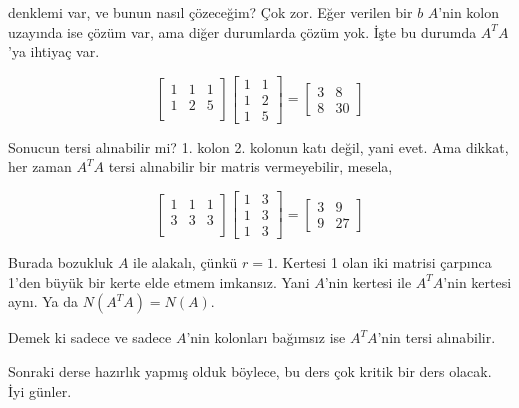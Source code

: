 \documentclass[12pt,fleqn]{article}\usepackage{../../common}
\begin{document}
denklemi var, ve bunun nasıl çözeceğim? Çok zor. Eğer verilen bir $b$ $A$'nin
kolon uzayında ise çözüm var, ama diğer durumlarda çözüm yok. İşte bu durumda
$A^TA$'ya ihtiyaç var.

$$ 
\left[\begin{array}{rrr}
1 & 1 & 1\\
1 & 2 & 5\\
\end{array}\right]
\left[\begin{array}{rr}
1 & 1 \\
1 & 2 \\
1 & 5
\end{array}\right] =
\left[\begin{array}{rr}
3 & 8 \\
8 & 30
\end{array}\right] 
 $$

Sonucun tersi alınabilir mi? 1. kolon 2. kolonun katı değil, yani evet. Ama
dikkat, her zaman $A^TA$ tersi alınabilir bir matris vermeyebilir, mesela,

$$ 
\left[\begin{array}{rrr}
1 & 1 & 1\\
3 & 3 & 3\\
\end{array}\right]
\left[\begin{array}{rr}
1 & 3 \\
1 & 3 \\
1 & 3
\end{array}\right] =
\left[\begin{array}{rr}
3 & 9 \\
9 & 27
\end{array}\right] 
 $$

Burada bozukluk $A$ ile alakalı, çünkü $r=1$. Kertesi 1 olan iki matrisi
çarpınca 1'den büyük bir kerte elde etmem imkansız. Yani $A$'nin kertesi
ile $A^TA$'nin kertesi aynı. Ya da $N(A^TA) = N(A)$. 

Demek ki sadece ve sadece $A$'nin kolonları bağımsız ise $A^TA$'nin tersi
alınabilir. 

Sonraki derse hazırlık yapmış olduk böylece, bu ders çok kritik bir ders
olacak. İyi günler.
\end{document}
